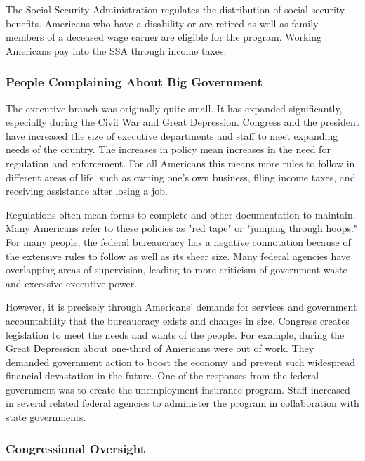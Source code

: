 \begin{definition}
    The Social Security Administration regulates the distribution of social
    security benefits. Americans who have a disability or are retired as well as
    family members of a deceased wage earner are eligible for the program.
    Working Americans pay into the SSA through income taxes.
\end{definition}

\subsubsection*{People Complaining About Big Government}

The executive branch was originally quite small. It has expanded significantly,
especially during the Civil War and Great Depression. Congress and the president
have increased the size of executive departments and staff to meet expanding
needs of the country. The increases in policy mean increases in the need for
regulation and enforcement. For all Americans this means more rules to follow in
different areas of life, such as owning one's own business, filing income taxes,
and receiving assistance after losing a job.

Regulations often mean forms to complete and other documentation to maintain.
Many Americans refer to these policies as "red tape" or "jumping through hoops."
For many people, the federal bureaucracy has a negative connotation because of
the extensive rules to follow as well as its sheer size. Many federal agencies
have overlapping areas of supervision, leading to more criticism of government
waste and excessive executive power.

However, it is precisely through Americans' demands for services and government
accountability that the bureaucracy exists and changes in size. Congress creates
legislation to meet the needs and wants of the people. For example, during the
Great Depression about one-third of Americans were out of work. They demanded
government action to boost the economy and prevent such widespread financial
devastation in the future. One of the responses from the federal government was
to create the unemployment insurance program. Staff increased in several related
federal agencies to administer the program in collaboration with state
governments.

\subsubsection*{Congressional Oversight}


